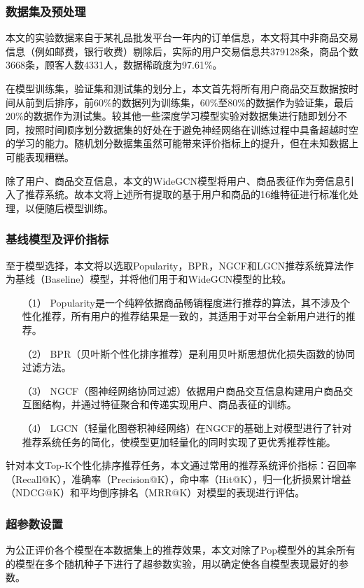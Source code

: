 \documentclass[lang=cn,11pt,a4paper,cite=authoryear]{elegantpaper}
\begin{document}
\subsubsection{数据集及预处理}
本文的实验数据来自于某礼品批发平台一年内的订单信息，本文将其中非商品交易信息（例如邮费，银行收费）剔除后，实际的用户交易信息共379128条，商品个数3668条，顾客人数4331人，数据稀疏度为97.61\%。

在模型训练集，验证集和测试集的划分上，本文首先将所有用户商品交互数据按时间从前到后排序，前60\%的数据列为训练集，60\%至80\%的数据作为验证集，最后20\%的数据作为测试集。较其他一些深度学习模型实验对数据集进行随即划分不同，按照时间顺序划分数据集的好处在于避免神经网络在训练过程中具备超越时空的学习的能力。随机划分数据集虽然可能带来评价指标上的提升，但在未知数据上可能表现糟糕。

除了用户、商品交互信息，本文的WideGCN模型将用户、商品表征作为旁信息引入了推荐系统。故本文将上述所有提取的基于用户和商品的16维特征进行标准化处理，以便随后模型训练。

\subsubsection{基线模型及评价指标}
至于模型选择，本文将以选取Popularity，BPR，NGCF和LGCN推荐系统算法作为基线（Baseline）模型，并将他们用于和WideGCN模型的比较。
\begin{itemize}
  \item [（1）]Popularity是一个纯粹依据商品畅销程度进行推荐的算法，其不涉及个性化推荐，所有用户的推荐结果是一致的，其适用于对平台全新用户进行的推荐。
  \item [（2）]BPR（贝叶斯个性化排序推荐）是利用贝叶斯思想优化损失函数的协同过滤方法。
  \item [（3）]NGCF（图神经网络协同过滤）依据用户商品交互信息构建用户商品交互图结构，并通过特征聚合和传递实现用户、商品表征的训练。
  \item [（4）]LGCN（轻量化图卷积神经网络）在NGCF的基础上对模型进行了针对推荐系统任务的简化，使模型更加轻量化的同时实现了更优秀推荐性能。
\end{itemize}

针对本文Top-K个性化排序推荐任务，本文通过常用的推荐系统评价指标：召回率（Recall@K），准确率（Precision@K），命中率（Hit@K），归一化折损累计增益（NDCG@K）和平均倒序排名（MRR@K）对模型的表现进行评估。

\subsubsection{超参数设置}
为公正评价各个模型在本数据集上的推荐效果，本文对除了Pop模型外的其余所有的模型在多个随机种子下进行了超参数实验，用以确定使各自模型表现最好的参数。
\end{document}
